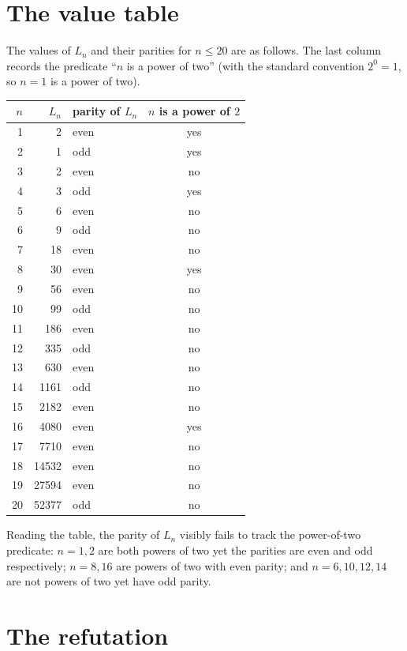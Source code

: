 \documentclass[11pt]{article}
\theoremstyle{definition}
\theoremstyle{remark}
\begin{document}
\section{The value table}

The values of $L_n$ and their parities for $n \le 20$ are as follows. The last
column records the predicate ``$n$ is a power of two'' (with the standard
convention $2^0 = 1$, so $n=1$ is a power of two).

\begin{center}
\begin{tabular}{r r l c}
\toprule
$n$ & $L_n$ & parity of $L_n$ & $n$ is a power of $2$ \\
\midrule
1  & 2       & even & yes \\
2  & 1       & odd  & yes \\
3  & 2       & even & no  \\
4  & 3       & odd  & yes \\
5  & 6       & even & no  \\
6  & 9       & odd  & no  \\
7  & 18      & even & no  \\
8  & 30      & even & yes \\
9  & 56      & even & no  \\
10 & 99      & odd  & no  \\
11 & 186     & even & no  \\
12 & 335     & odd  & no  \\
13 & 630     & even & no  \\
14 & 1161    & odd  & no  \\
15 & 2182    & even & no  \\
16 & 4080    & even & yes \\
17 & 7710    & even & no  \\
18 & 14532   & even & no  \\
19 & 27594   & even & no  \\
20 & 52377   & odd  & no  \\
\bottomrule
\end{tabular}
\end{center}

Reading the table, the parity of $L_n$ visibly fails to track the
power-of-two predicate: $n = 1, 2$ are both powers of two yet the parities are
even and odd respectively; $n = 8, 16$ are powers of two with even parity; and
$n = 6, 10, 12, 14$ are not powers of two yet have odd parity.

\section{The refutation}
\end{document}
